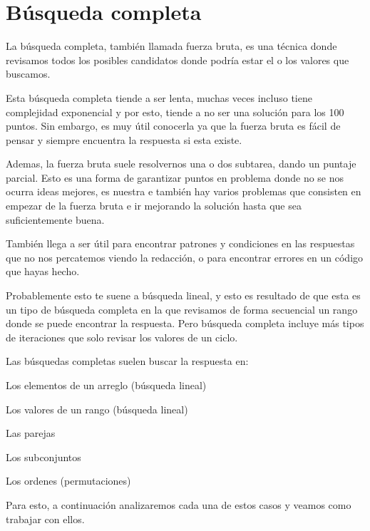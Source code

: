 \chapter*{Búsqueda completa}

La búsqueda completa, también llamada fuerza bruta, es una técnica donde revisamos todos los posibles candidatos donde podría estar el o los valores que buscamos.

Esta búsqueda completa tiende a ser lenta, muchas veces incluso tiene complejidad exponencial y por esto, tiende a no ser una solución para los 100 puntos. Sin embargo, es muy útil conocerla ya que la fuerza bruta es fácil de pensar y siempre encuentra la respuesta si esta existe.

Ademas, la fuerza bruta suele resolvernos una o dos subtarea, dando un puntaje parcial. Esto es una forma de garantizar puntos en problema donde no se nos ocurra ideas mejores, es nuestra e también hay varios problemas que consisten en empezar de la fuerza bruta e ir mejorando la solución hasta que sea suficientemente buena.

También llega a ser útil para encontrar patrones y condiciones en las respuestas que no nos percatemos viendo la redacción, o para encontrar errores en un código que hayas hecho.

Probablemente esto te suene a búsqueda lineal, y esto es resultado de que esta es un tipo de búsqueda completa en la que revisamos de forma secuencial un rango donde se puede encontrar la respuesta. Pero búsqueda completa incluye más tipos de iteraciones que solo revisar los valores de un ciclo.

Las búsquedas completas suelen buscar la respuesta en:

\begin{plimits}
	\item Los elementos de un arreglo (búsqueda lineal)
	\item Los valores de un rango (búsqueda lineal)
	\item Las parejas
	\item Los subconjuntos
	\item Los ordenes (permutaciones)
\end{plimits}

Para esto, a continuación analizaremos cada una de estos casos y veamos como trabajar con ellos.